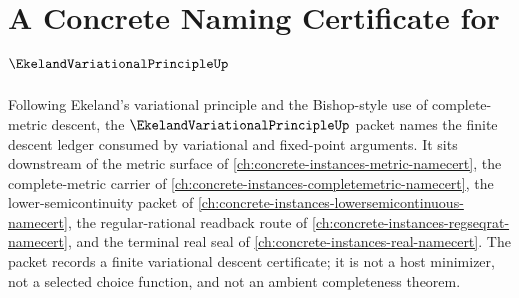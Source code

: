\chapter{A Concrete Naming Certificate for $\EkelandVariationalPrincipleUp$}
\label{ch:concrete-instances-ekeland-variational-principle-namecert}

Following Ekeland's variational principle and the Bishop-style use of complete-metric descent, the $\EkelandVariationalPrincipleUp$ packet names the finite descent ledger consumed by variational and fixed-point arguments. It sits downstream of the metric surface of \autoref{ch:concrete-instances-metric-namecert}, the complete-metric carrier of \autoref{ch:concrete-instances-completemetric-namecert}, the lower-semicontinuity packet of \autoref{ch:concrete-instances-lowersemicontinuous-namecert}, the regular-rational readback route of \autoref{ch:concrete-instances-regseqrat-namecert}, and the terminal real seal of \autoref{ch:concrete-instances-real-namecert}. The packet records a finite variational descent certificate; it is not a host minimizer, not a selected choice function, and not an ambient completeness theorem.

